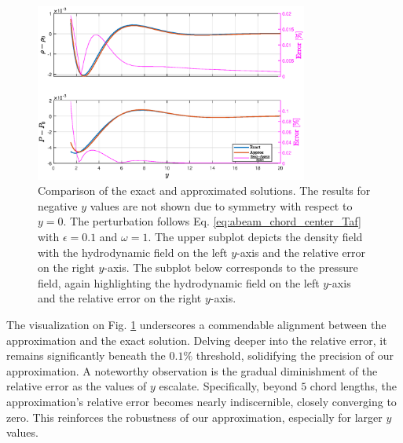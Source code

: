 \begin{figure}[H]
    \centering
    \includegraphics[width=0.8\textwidth]{drawings/ACC.eps} 
    \caption{\footnotesize{Comparison of the exact and approximated solutions. The results for negative $y$ values are not shown due to symmetry with respect to $y=0$. The perturbation follows Eq. \ref{eq:abeam_chord_center_Taf} with $\epsilon = 0.1$ and $\omega = 1$. The upper subplot depicts the density field with the hydrodynamic field on the left $y$-axis and the relative error on the right $y$-axis. The subplot below corresponds to the pressure field, again highlighting the hydrodynamic field on the left $y$-axis and the relative error on the right $y$-axis.}}
    \label{fig:ACC_comparison}
\end{figure}
The visualization on Fig. \ref{fig:ACC_comparison} underscores a commendable alignment between the approximation and the exact solution. Delving deeper into the relative error, it remains significantly beneath the $0.1\%$ threshold, solidifying the precision of our approximation. A noteworthy observation is the gradual diminishment of the relative error as the values of $y$ escalate. Specifically, beyond $5$ chord lengths, the approximation's relative error becomes nearly indiscernible, closely converging to zero. This reinforces the robustness of our approximation, especially for larger $y$ values.